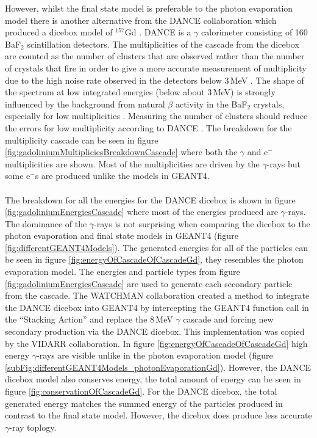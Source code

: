 
However, whilst the final state model is preferable to the photon evaporation model there is another alternative from the DANCE collaboration which produced a dicebox model of $^{157}$Gd \cite{Chyzh_2011}. DANCE is a $\gamma$ calorimeter consisting of 160 BaF$_2$ scintillation detectors. The multiplicities of the cascade from the dicebox are counted as the number of clusters that are observed rather than the number of crystals that fire in order to give a more accurate measurement of multiplicity due to the high noise rate observed in the detectors below 3\,MeV \cite{Chyzh_2011}. The shape of the spectrum at low integrated energies (below about 3\,MeV) is strongly influenced by the background from natural $\beta$ activity in the BaF$_2$ crystals, especially for low multiplicities \cite{Chyzh_2011}. Measuring the number of clusters should reduce the errors for low multiplicity according to DANCE \cite{Chyzh_2011}. The breakdown for the multiplicity cascade can be seen in figure \ref{fig:gadoliniumMultipliciesBreakdownCascade} where both the $\gamma$ and e$^-$ multiplicities are shown. Most of the multiplicities are driven by the $\gamma$-rays but some e$^-$s are produced unlike the models in GEANT4. 
\\\\The breakdown for all the energies for the DANCE dicebox is shown in figure \ref{fig:gadoliniumEnergiesCascade} where most of the energies produced are $\gamma$-rays. The dominance of the $\gamma$-rays is not surprising when comparing the dicebox to the photon evaporation and final state models in GEANT4 (figure \ref{fig:differentGEANT4Models}). The generated energies for all of the particles can be seen in figure \ref{fig:energyOfCascadeOfCascadeGd}, they resembles the photon evaporation model. The energies and particle types from figure \ref{fig:gadoliniumEnergiesCascade} are used to generate each secondary particle from the cascade. The WATCHMAN collaboration created a method to integrate the DANCE dicebox into GEANT4 by intercepting the GEANT4 function call in the ``Stacking Action'' and replace the 8\,MeV $\gamma$ cascade and forcing new secondary production via the DANCE dicebox. This implementation was copied by the VIDARR collaboration. In figure \ref{fig:energyOfCascadeOfCascadeGd} high energy $\gamma$-rays are visible unlike in the photon evaporation model (figure \ref{subFig:differentGEANT4Models_photonEvaporationGd}). However, the DANCE dicebox model also conserves energy, the total amount of energy can be seen in figure  \ref{fig:conservationOfCascadeGd}. For the DANCE dicebox, the total generated energy matches the summed energy of the particles produced in contrast to the final state model. However, the dicebox does produce less accurate $\gamma$-ray toplogy.

